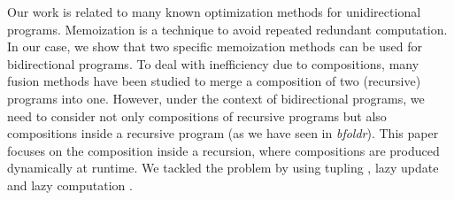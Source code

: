 Our work is related to many known optimization methods for unidirectional programs. Memoization \cite{Bellman:2003:DP:862270,MICHIE1968} is a technique to avoid repeated redundant computation. In our case, we show that two specific memoization methods can be used for bidirectional programs.
To deal with inefficiency due to compositions, many fusion methods have been studied \cite{Wadler:1988:DTP:80099.80104} to merge a composition of two (recursive) programs into one. However, under the context of bidirectional programs, we need to consider not only compositions of recursive programs but also compositions inside a recursive program (as we have seen in \mbox{\it bfoldr}). This paper focuses on the composition inside a recursion, where compositions are produced dynamically at runtime. We tackled the problem by using tupling \cite{Fokkinga90}, lazy update and lazy computation \cite{Henderson:1976:LE:800168.811543, Hudak:2007:HHL:1238844.1238856}.






